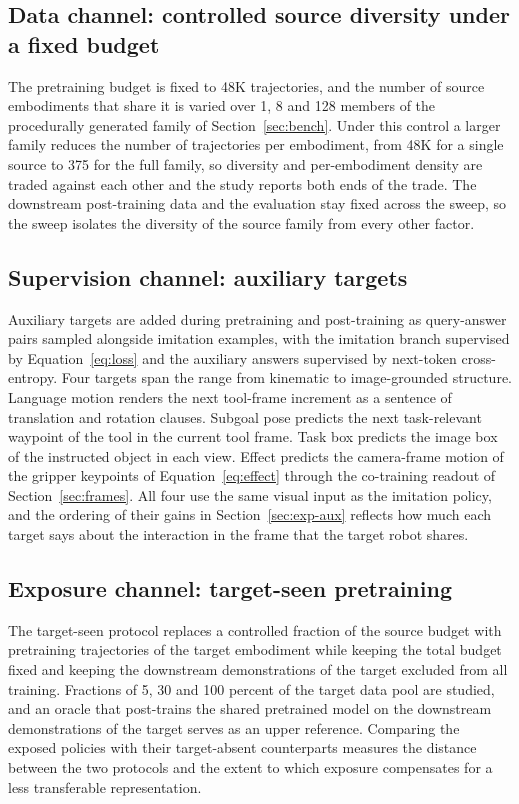 \subsection{Data channel: controlled source diversity under a fixed budget}
\label{sec:data}

The pretraining budget is fixed to 48K trajectories, and the number of source embodiments that share it is varied over 1, 8 and 128 members of the procedurally generated family of Section~\ref{sec:bench}. Under this control a larger family reduces the number of trajectories per embodiment, from 48K for a single source to 375 for the full family, so diversity and per-embodiment density are traded against each other and the study reports both ends of the trade. The downstream post-training data and the evaluation stay fixed across the sweep, so the sweep isolates the diversity of the source family from every other factor.

\subsection{Supervision channel: auxiliary targets}
\label{sec:aux}

Auxiliary targets are added during pretraining and post-training as query-answer pairs sampled alongside imitation examples, with the imitation branch supervised by Equation~\eqref{eq:loss} and the auxiliary answers supervised by next-token cross-entropy. Four targets span the range from kinematic to image-grounded structure. Language motion renders the next tool-frame increment as a sentence of translation and rotation clauses. Subgoal pose predicts the next task-relevant waypoint of the tool in the current tool frame. Task box predicts the image box of the instructed object in each view. Effect predicts the camera-frame motion of the gripper keypoints of Equation~\eqref{eq:effect} through the co-training readout of Section~\ref{sec:frames}. All four use the same visual input as the imitation policy, and the ordering of their gains in Section~\ref{sec:exp-aux} reflects how much each target says about the interaction in the frame that the target robot shares.

\subsection{Exposure channel: target-seen pretraining}
\label{sec:exposure-design}

The target-seen protocol replaces a controlled fraction of the source budget with pretraining trajectories of the target embodiment while keeping the total budget fixed and keeping the downstream demonstrations of the target excluded from all training. Fractions of 5, 30 and 100 percent of the target data pool are studied, and an oracle that post-trains the shared pretrained model on the downstream demonstrations of the target serves as an upper reference. Comparing the exposed policies with their target-absent counterparts measures the distance between the two protocols and the extent to which exposure compensates for a less transferable representation.
